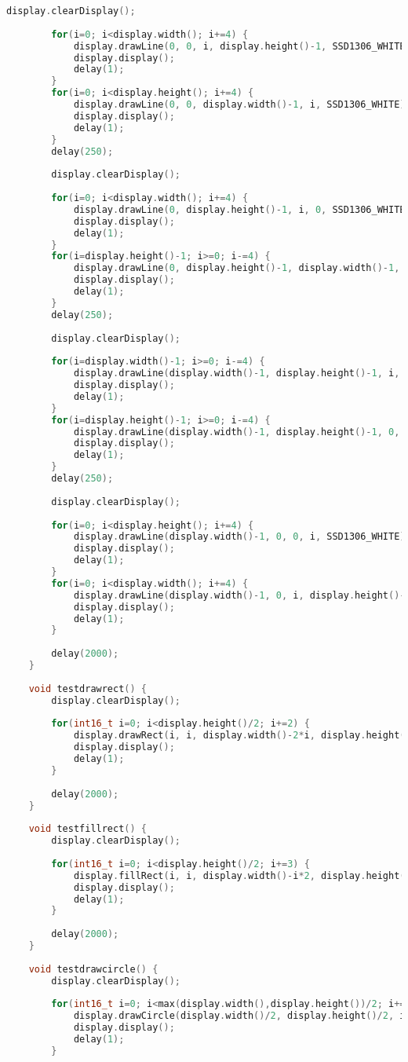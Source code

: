 \begin{code}
\begin{lstlisting}[language=c++]
		display.clearDisplay();
		
		for(i=0; i<display.width(); i+=4) {
			display.drawLine(0, 0, i, display.height()-1, SSD1306_WHITE);
			display.display();
			delay(1);
		}
		for(i=0; i<display.height(); i+=4) {
			display.drawLine(0, 0, display.width()-1, i, SSD1306_WHITE);
			display.display();
			delay(1);
		}
		delay(250);
		
		display.clearDisplay();
		
		for(i=0; i<display.width(); i+=4) {
			display.drawLine(0, display.height()-1, i, 0, SSD1306_WHITE);
			display.display();
			delay(1);
		}
		for(i=display.height()-1; i>=0; i-=4) {
			display.drawLine(0, display.height()-1, display.width()-1, i, SSD1306_WHITE);
			display.display();
			delay(1);
		}
		delay(250);
		
		display.clearDisplay();
		
		for(i=display.width()-1; i>=0; i-=4) {
			display.drawLine(display.width()-1, display.height()-1, i, 0, SSD1306_WHITE);
			display.display();
			delay(1);
		}
		for(i=display.height()-1; i>=0; i-=4) {
			display.drawLine(display.width()-1, display.height()-1, 0, i, SSD1306_WHITE);
			display.display();
			delay(1);
		}
		delay(250);
		
		display.clearDisplay();
		
		for(i=0; i<display.height(); i+=4) {
			display.drawLine(display.width()-1, 0, 0, i, SSD1306_WHITE);
			display.display();
			delay(1);
		}
		for(i=0; i<display.width(); i+=4) {
			display.drawLine(display.width()-1, 0, i, display.height()-1, SSD1306_WHITE);
			display.display();
			delay(1);
		}
		
		delay(2000);
	}
	
	void testdrawrect() {
		display.clearDisplay();
		
		for(int16_t i=0; i<display.height()/2; i+=2) {
			display.drawRect(i, i, display.width()-2*i, display.height()-2*i, SSD1306_WHITE);
			display.display();
			delay(1);
		}
		
		delay(2000);
	}
	
	void testfillrect() {
		display.clearDisplay();
		
		for(int16_t i=0; i<display.height()/2; i+=3) {
			display.fillRect(i, i, display.width()-i*2, display.height()-i*2, SSD1306_INVERSE);
			display.display();
			delay(1);
		}
		
		delay(2000);
	}
	
	void testdrawcircle() {
		display.clearDisplay();
		
		for(int16_t i=0; i<max(display.width(),display.height())/2; i+=2) {
			display.drawCircle(display.width()/2, display.height()/2, i, SSD1306_WHITE);
			display.display();
			delay(1);
		}
		

\end{lstlisting}
\end{code}
